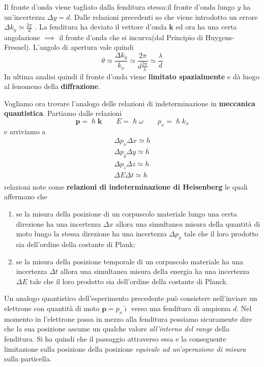 Il fronte d'onda viene tagliato dalla fenditura stessa:il fronte d'onda
lungo \(y\) ha un'incertezza \(\Delta y = d\).
Dalle relazioni
precedenti so che viene introdotto un errore
\(\Delta k_{y} \simeq\frac{2\pi}{d}\) .
La fenditura ha deviato il
vettore d'onda \(\bm{k}\) ed ora ha una certa angolazione \(\implies\)
il fronte d'onda che si incurva(dal Principio di Huygens-Fresnel).
L'angolo di apertura vale quindi \[
	\theta \simeq\frac{\Delta k_{y}}{k_{x}} \simeq \frac{2\pi}{d  \frac{2\pi}{\lambda}} \simeq\frac{\lambda}{d}
\] In ultima analisi quindi il fronte d'onda viene \textbf{limitato
	spazialmente} e dà luogo al fenomeno della \textbf{diffrazione}.

Vogliamo ora trovare l'analogo delle relazioni di indeterminazione in
\textbf{meccanica quantistica}.
Partiamo dalle relazioni \[
	\bm{p} = \hslash \bm{k} \qquad E = \hslash \omega \qquad p_{x} = \hslash k_{x}
\] e arriviamo a \begin{gather*}
	\Delta p_{x} \Delta x \simeq h\\
	\Delta p_{y} \Delta y \simeq h\\
	\Delta p_{z} \Delta z \simeq h\\
	\Delta E \Delta t \simeq h\\
\end{gather*} relazioni note come \textbf{relazioni di indeterminazione di
	Heisenberg} le quali affermano che

\begin{enumerate}
	\tightlist
	\item
	      se la misura della posizione di un corpuscolo materiale lungo una
	      certa direzione ha una incertezza \(\Delta x\) allora una simultanea
	      misura della quantità di moto lungo la stessa direzione ha una
	      incertezza \(\Delta p_x\) tale che il loro prodotto sia dell'ordine
	      della costante di Plank;
	\item
	      se la misura della posizione temporale di un corpuscolo materiale ha
	      una incertezza \(\Delta t\) allora una simultanea misura della energia
	      ha una incertezza \(\Delta E\) tale che il loro prodotto sia
	      dell'ordine della costante di Planck.
\end{enumerate}

Un analogo quantistico dell'esperimento precedente può consistere
nell'inviare un elettrone con quantità di moto
\(\bm{p} = p_{x} \hat{\imath}\) verso una fenditura di ampiezza \(d\).
Nel
momento in l'elettrone passa in mezzo alla fenditura possiamo
sicuramente dire che la sua posizione assume un qualche valore
\emph{all'interno del range} della fenditura.
Si ha quindi che il passaggio attraverso essa e la conseguente limitazione sulla posizione
della posizione \emph{equivale ad un'operazione di misura} sulla
particella.

